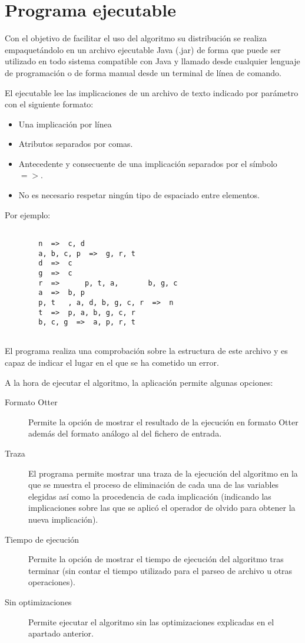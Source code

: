 	
	
\section*{Programa ejecutable}

	Con el objetivo de facilitar el uso del algoritmo su distribución se realiza empaquetándolo en un archivo ejecutable Java (.jar) de forma que puede ser utilizado en todo sistema compatible con Java y llamado desde cualquier lenguaje de programación o de forma manual desde un terminal de línea de comando. 	
	
	El ejecutable lee las implicaciones de un archivo de texto indicado por parámetro con el siguiente formato:
	
	\begin{itemize}
		\item Una implicación por línea
		\item Atributos separados por comas.
		\item Antecedente y consecuente de una implicación separados por el símbolo $=>$.
		\item No es necesario respetar ningún tipo de espaciado entre elementos.
	\end{itemize}

	Por ejemplo:
	
	\begin{lstlisting}
		
		n  =>  c, d 
		a, b, c, p  =>  g, r, t 
		d  =>  c 
		g  =>  c 
		r  =>      p, t, a,       b, g, c 
		a  =>  b, p 
		p, t   , a, d, b, g, c, r  =>  n 
		t  =>  p, a, b, g, c, r 
		b, c, g  =>  a, p, r, t 
	
	\end{lstlisting}
	
	El programa realiza una comprobación sobre la estructura de este archivo y es capaz de indicar el lugar en el que se ha cometido un error.
	
	A la hora de ejecutar el algoritmo, la aplicación permite algunas opciones:
	
	\begin{description}
		\item[Formato Otter] 
			Permite la opción de mostrar el resultado de la ejecución en formato Otter además del formato análogo al del fichero de entrada.
		\item[Traza] 
			El programa permite mostrar una traza de la ejecución del algoritmo en la que se muestra el proceso de eliminación de cada una de las variables elegidas así como la procedencia de cada implicación (indicando las implicaciones sobre las que se aplicó el operador de olvido para obtener la nueva implicación).
		\item[Tiempo de ejecución] 
			Permite la opción de mostrar el tiempo de ejecución del algoritmo tras terminar (sin contar el tiempo utilizado para el parseo de archivo u otras operaciones).
		\item[Sin optimizaciones] 
			Permite ejecutar el algoritmo sin las optimizaciones explicadas en el apartado anterior.
	\end{description}

